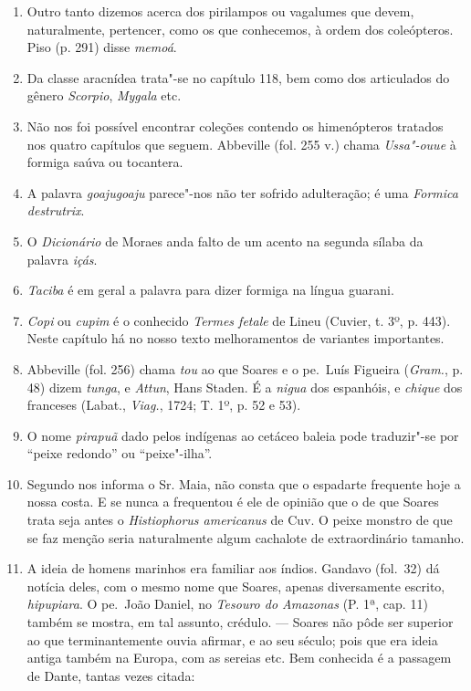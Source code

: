 \begin{enumerate}
\item Outro tanto dizemos acerca dos pirilampos ou vagalumes que devem, 
naturalmente, pertencer, como os que conhecemos, à ordem dos coleópteros. Piso 
(p. 291) disse \textit{memoá}.

\item Da classe aracnídea trata"-se no capítulo 118, bem como dos articulados do 
gênero \textit{Scorpio}, \textit{Mygala} etc.

\item Não nos foi possível encontrar coleções contendo os himenópteros tratados nos 
quatro capítulos que seguem. Abbeville (fol. 255 v.) chama \textit{Ussa"-ouue} à formiga 
saúva ou tocantera.

\item A palavra \textit{goajugoaju} parece"-nos não ter sofrido adulteração; é uma \textit{Formica destrutrix}.

\item O \textit{Dicionário} de Moraes anda falto de um acento na segunda sílaba da palavra \textit{içás}.

\item  \textit{Taciba} é em geral a palavra para dizer formiga na língua guarani.

\item \textit{Copi} ou \textit{cupim} é o conhecido \textit{Termes fetale} de Lineu (Cuvier, t. 3º, p. 443). 
Neste capítulo há no nosso texto melhoramentos de variantes importantes.

\item Abbeville (fol. 256) chama \textit{tou} ao que Soares e o pe.~Luís Figueira (\textit{Gram.}, p. 48) 
dizem \textit{tunga}, e \textit{Attun}, Hans Staden. É a \textit{nigua} dos espanhóis, e \textit{chique} dos franceses 
(Labat., \textit{Viag.}, 1724; T. 1º, p. 52 e 53).

\item O nome \textit{pirapuã} dado pelos indígenas ao cetáceo baleia pode traduzir"-se por ``peixe redondo'' ou ``peixe"-ilha''. 

\item Segundo nos informa o Sr. Maia, não consta que o espadarte frequente hoje a 
nossa costa. E se nunca a frequentou é ele de opinião que o de que Soares trata seja 
antes o \textit{Histiophorus americanus} de Cuv. O peixe monstro de que se faz menção seria 
naturalmente algum cachalote de extraordinário tamanho.

\item A ideia de homens marinhos era familiar aos índios. Gandavo (fol.~32) dá notícia 
deles, com o mesmo nome que Soares, apenas diversamente escrito, \textit{hipupiara}. O 
pe.~João Daniel, no \textit{Tesouro do Amazonas} (P. 1ª, cap. 11) também se mostra, em tal 
assunto, crédulo. --- Soares não pôde ser superior ao que terminantemente ouvia 
afirmar, e ao seu século; pois que era ideia antiga também na Europa, com as sereias 
etc. Bem conhecida é a passagem de Dante, tantas vezes citada: 


\end{enumerate}
